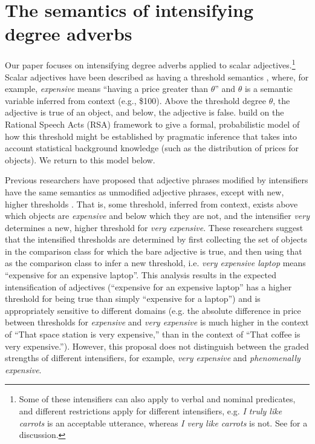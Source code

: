 \documentclass[10pt,letterpaper]{article}
\newcommand{\w}[1]{\emph{#1}}
\begin{document}
\section{The semantics of intensifying degree adverbs}

Our paper focuses on intensifying degree adverbs applied to scalar adjectives.\footnote{
  Some of these intensifiers can also apply to verbal and nominal predicates, and different restrictions apply for different intensifiers, e.g. \w{I truly like carrots} is an acceptable utterance, whereas \w{I very like carrots} is not. See  for a discussion.
 }
Scalar adjectives have been described as having a threshold semantics \cite{kennedy}, where, for example, \w{expensive} means ``having a price greater than $\theta$'' and $\theta$ is a semantic variable inferred from context (e.g., \$100). Above the threshold degree $\theta$, the adjective is true of an object, and below, the adjective is false.  build on the Rational Speech Acts (RSA) framework \cite{frank,goodman} to give a formal, probabilistic model of how this threshold might be established by pragmatic inference that takes into account statistical background knowledge (such as the distribution of prices for objects). We return to this model below.

Previous researchers have proposed that adjective phrases modified by intensifiers have the same semantics as unmodified adjective phrases, except with new, higher thresholds \cite{kennedyMcnally, klein, wheeler}. That is, some threshold, inferred from context, exists above which objects are \w{expensive} and below which they are not, and the intensifier \w{very} determines a new, higher threshold for \w{very expensive}.
These researchers suggest that the intensified thresholds are determined by first collecting the set of objects in the comparison class for which the bare adjective is true, and then using that as the comparison class to infer a new threshold, i.e. \w{very expensive laptop} means ``expensive for an expensive laptop''. This analysis results in the expected intensification of adjectives (``expensive for an expensive laptop'' has a higher threshold for being true than simply ``expensive for a laptop'') and is appropriately sensitive to different domains (e.g. the absolute difference in price between thresholds for \w{expensive} and \w{very expensive} is much higher in the context of ``That space station is very expensive,'' than in the context of ``That coffee is very expensive.'').
However, this proposal does not distinguish between the graded strengths of different intensifiers, for example, \w{very expensive} and \w{phenomenally expensive}.
\end{document}
